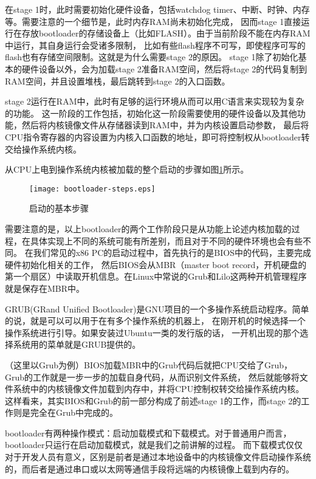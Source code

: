 在stage 1时，此时需要初始化硬件设备，包括watchdog timer、中断、时钟、内存等。需要注意的一个细节是，此时内存RAM尚未初始化完成，
因而stage 1直接运行在存放bootloader的存储设备上（比如FLASH）。由于当前阶段不能在内存RAM中运行，其自身运行会受诸多限制，
比如有些flash程序不可写，即使程序可写的flash也有存储空间限制。这就是为什么需要stage 2的原因。
stage 1除了初始化基本的硬件设备以外，会为加载stage 2准备RAM空间，然后将stage 2的代码复制到RAM空间，并且设置堆栈，最后跳转到stage 2的入口函数。

stage 2运行在RAM中，此时有足够的运行环境从而可以用C语言来实现较为复杂的功能。
这一阶段的工作包括，初始化这一阶段需要使用的硬件设备以及其他功能，然后将内核镜像文件从存储器读到RAM中，并为内核设置启动参数，
最后将CPU指令寄存器的内容设置为内核入口函数的地址，即可将控制权从bootloader转交给操作系统内核。

从CPU上电到操作系统内核被加载的整个启动的步骤如图\ref{fig:bootloader-steps}所示。

\begin{figure}[htbp]
  \centering
  \texttt{[image: bootloader-steps.eps]}
  \caption{启动的基本步骤}\label{fig:bootloader-steps} 
\end{figure}

需要注意的是，以上bootloader的两个工作阶段只是从功能上论述内核加载的过程，在具体实现上不同的系统可能有所差别，而且对于不同的硬件环境也会有些不同。
在我们常见的x86 PC的启动过程中，首先执行的是BIOS中的代码，主要完成硬件初始化相关的工作，
然后BIOS会从MBR（master boot record，开机硬盘的第一个扇区）中读取开机信息。在Linux中常说的Grub和Lilo这两种开机管理程序就是保存在MBR中。

\begin{note}
GRUB(GRand Unified Bootloader)是GNU项目的一个多操作系统启动程序。简单的说，就是可以可以用于在有多个操作系统的机器上，
在刚开机的时候选择一个操作系统进行引导。如果安装过Ubuntu一类的发行版的话， 一开机出现的那个选择系统用的菜单就是GRUB提供的。
\end{note}

（这里以Grub为例）BIOS加载MBR中的Grub代码后就把CPU交给了Grub，Grub的工作就是一步一步的加载自身代码，从而识别文件系统，
然后就能够将文件系统中的内核镜像文件加载到内存中，并将CPU控制权转交给操作系统内核。
这样看来，其实BIOS和Grub的前一部分构成了前述stage 1的工作，而stage 2的工作则是完全在Grub中完成的。

\begin{note}
bootloader有两种操作模式：启动加载模式和下载模式。对于普通用户而言，bootloader只运行在启动加载模式，就是我们之前讲解的过程。
而下载模式仅仅对于开发人员有意义，区别是前者是通过本地设备中的内核镜像文件启动操作系统的，而后者是通过串口或以太网等通信手段将远端的内核镜像上载到内存的。
\end{note}

